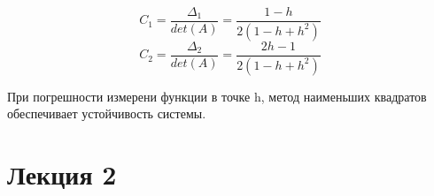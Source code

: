 \documentclass[12pt]{article}
\begin{document}
\[ C_1 = \frac{\Delta_1}{det(A)} = \frac{1 - h}{2 (1 - h + h^2)} \] 
\[ C_2 = \frac{\Delta_2}{det(A)} = \frac{2 h - 1}{2 (1 - h + h^2)} \] 

При погрешности измерени функции в точке h, метод наименьших квадратов
обеспечивает устойчивость системы.

\section{Лекция 2}
\end{document}
